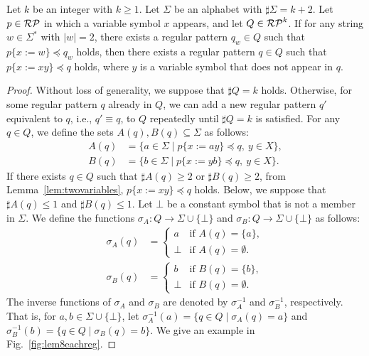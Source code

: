 \begin{lem}\label{Add-Lemma01}
Let $k$ be an integer with $k\geq 1$.
Let $\Sigma$ be an alphabet with $\sharp \Sigma = k + 2$.
Let $p \in \mathcal{RP}$ in which a variable symbol $x$ appears, and let $Q \in \mathcal{RP}^{k}$.
If for any string $w \in \Sigma^{\ast}$ with $|w|=2$, there exists a regular pattern $q_{w} \in Q$ such that $p \{ x:=w \} \preceq q_{w}$ holds, then there exists a regular pattern $q \in Q$ such that $p \{ x:=xy \} \preceq q$ holds, where $y$ is a variable symbol that does not appear in $q$.
\end{lem}

\begin{proof}
Without loss of generality, we suppose that $\sharp Q = k$ holds. Otherwise, for some regular pattern $q$ already in $Q$, we can add a new regular pattern $q'$ equivalent to $q$, i.e., $q' \equiv q$, to $Q$ repeatedly until $\sharp Q = k$ is satisfied.
For any $q \in Q$, we define the sets $A(q), B(q) \subseteq \Sigma$ as follows:
\begin{align*}
  A(q) & = \{ a \in \Sigma \mid p \{ x:=ay \} \preceq q,\ y\in X\},\\ 
  B(q) & = \{ b \in \Sigma \mid p \{ x:=yb \} \preceq q,\ y\in X\}.
  \end{align*}
If there exists $q\in Q$ such that $\sharp A(q)\geq 2$ or $\sharp B(q)\geq 2$, from Lemma~\ref{lem:twovariables}, $p\{x := xy\} \preceq q$ holds.
Below, we suppose that $\sharp A(q)\leq 1$ and $\sharp B(q)\leq 1$.
Let $\bot$ be a constant symbol that is not a member in $\Sigma$.
We define the functions $\sigma_{A}: Q \rightarrow \Sigma \cup \{\bot\}$ and $\sigma_{B}: Q \rightarrow \Sigma \cup \{\bot\}$ as follows:
\begin{align*}
  \sigma_{A}(q) & =
  \begin{cases}
    a & \textrm{if } A(q) = \{a\}, \\
    \bot & \textrm{if } A(q) = \emptyset.
  \end{cases}\\
  \sigma_{B}(q) & =
  \begin{cases}
    b & \textrm{if } B(q) = \{b\}, \\
    \bot & \textrm{if } B(q) = \emptyset.
  \end{cases}
\end{align*}
The inverse functions of $\sigma_{A}$ and $\sigma_{B}$ are denoted by $\sigma_{A}^{-1}$ and $\sigma_{B}^{-1}$, respectively. That is, for $a,b \in \Sigma \cup \{\bot\}$, let $\sigma_{A}^{-1}(a) = \{q \in Q \mid \sigma_{A}(q) = a\}$ and $\sigma_{B}^{-1}(b) = \{q \in Q \mid \sigma_{B}(q) = b\}$. 
We give an example in Fig.~\ref{fig:lem8eachreg}.


\end{proof}
